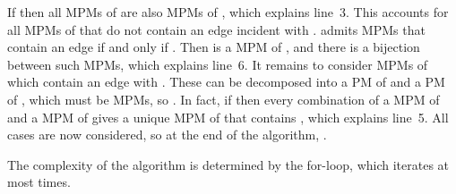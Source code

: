\documentclass{llncs}
\newcommand{\QED}{\hspace*{\fill}{}\medskip}
\begin{document}
If  then all MPMs of  are also MPMs of , which explains line~3. This accounts for all MPMs of  that do not contain an edge incident with .  admits MPMs  that contain an edge  if and only if . Then  is a MPM of , and there is a bijection between such MPMs, which explains line~6. It remains to consider MPMs  of  which contain an edge  with . 
These can be decomposed into a PM of  and a PM of , which must be MPMs, so . In fact, if  then every combination of a MPM of  and a MPM of  gives a unique MPM of  that contains , which explains line~5.
All cases are now considered, so at the end of the algorithm, .

The complexity of the algorithm is determined by the for-loop, which iterates at most  times.
\QED
\end{document}
